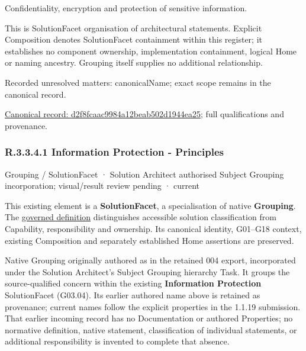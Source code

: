 Confidentiality, encryption and protection of sensitive information.



This is SolutionFacet organisation of architectural statements. Explicit Composition denotes SolutionFacet containment within this register; it establishes no component ownership, implementation containment, logical Home or naming ancestry. Grouping itself supplies no additional relationship.


{\small Recorded unresolved matters: canonicalName; exact scope remains in the canonical record.}\par
{\footnotesize \href{../../../../../../../continuum/grouping/d2f8fcaac9984a12beab502d1944ea25.md}{Canonical record: d2f8fcaac9984a12beab502d1944ea25}; full qualifications and provenance.}\par
\subsubsection*{R.3.3.4.1 Information Protection - Principles}
\label{navigation:R.3.3.4.1}

\label{element:1cdc1ee62ec548998a8db6ee23b59ca1}
{\small Grouping / SolutionFacet · Solution Architect authorised Subject Grouping incorporation; visual/result review pending · current}\par

This existing element is a \textbf{SolutionFacet}, a specialisation of native
\textbf{Grouping}. The \href{\detokenize{../../../../../../../governance/continuum-representation.md#solutionfacet-classification--1119-candidate}}{governed definition}
distinguishes accessible solution classification from Capability, responsibility
and ownership. Its canonical identity, G01–G18 context, existing Composition
and separately established Home assertions are preserved.



Native Grouping originally authored as \texttt{} in the retained 004 export,
incorporated under the Solution Architect's Subject Grouping hierarchy Task.
It groups the source-qualified \texttt{} concern within
the existing \textbf{Information Protection} SolutionFacet (G03.04). Its earlier authored name above is retained as provenance; current names
follow the explicit properties in the 1.1.19 submission.
That earlier incoming record has no Documentation or authored Properties; no normative
definition, native statement, classification of individual statements, or
additional responsibility is invented to complete that absence.



